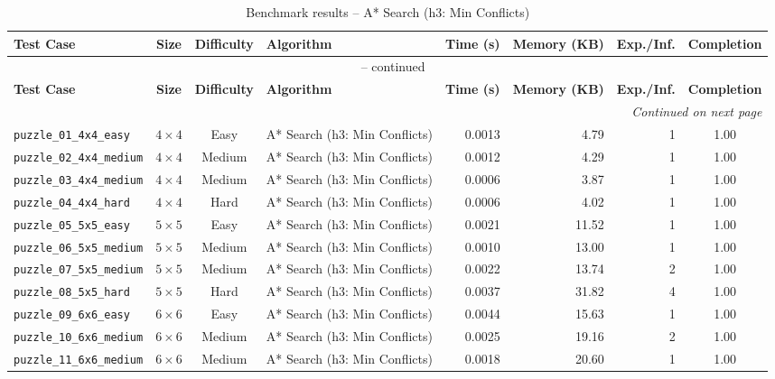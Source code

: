 \documentclass{article}
\begin{document}
\begin{longtable}{@{}lccl r r r c@{}}
  \caption{Benchmark results -- A* Search (h3: Min Conflicts)} \label{tab:a__search__h3__min_conflicts} \\
  \toprule
  \textbf{Test Case} & \textbf{Size} & \textbf{Difficulty} & \textbf{Algorithm} & \textbf{Time (s)} & \textbf{Memory (KB)} & \textbf{Exp./Inf.} & \textbf{Completion} \\
  \midrule
  \endfirsthead
  \multicolumn{8}{c}{\tablename\ \thetable{} -- continued} \\
  \toprule
  \textbf{Test Case} & \textbf{Size} & \textbf{Difficulty} & \textbf{Algorithm} & \textbf{Time (s)} & \textbf{Memory (KB)} & \textbf{Exp./Inf.} & \textbf{Completion} \\
  \midrule
  \endhead
  \midrule
  \multicolumn{8}{r}{\textit{Continued on next page}} \\
  \endfoot
  \bottomrule
  \endlastfoot
  \texttt{puzzle\_01\_4x4\_easy} & $4\times4$ & Easy & A* Search (h3: Min Conflicts) & 0.0013 & 4.79 & 1 & 1.00 \\
  \texttt{puzzle\_02\_4x4\_medium} & $4\times4$ & Medium & A* Search (h3: Min Conflicts) & 0.0012 & 4.29 & 1 & 1.00 \\
  \texttt{puzzle\_03\_4x4\_medium} & $4\times4$ & Medium & A* Search (h3: Min Conflicts) & 0.0006 & 3.87 & 1 & 1.00 \\
  \texttt{puzzle\_04\_4x4\_hard} & $4\times4$ & Hard & A* Search (h3: Min Conflicts) & 0.0006 & 4.02 & 1 & 1.00 \\
  \texttt{puzzle\_05\_5x5\_easy} & $5\times5$ & Easy & A* Search (h3: Min Conflicts) & 0.0021 & 11.52 & 1 & 1.00 \\
  \texttt{puzzle\_06\_5x5\_medium} & $5\times5$ & Medium & A* Search (h3: Min Conflicts) & 0.0010 & 13.00 & 1 & 1.00 \\
  \texttt{puzzle\_07\_5x5\_medium} & $5\times5$ & Medium & A* Search (h3: Min Conflicts) & 0.0022 & 13.74 & 2 & 1.00 \\
  \texttt{puzzle\_08\_5x5\_hard} & $5\times5$ & Hard & A* Search (h3: Min Conflicts) & 0.0037 & 31.82 & 4 & 1.00 \\
  \texttt{puzzle\_09\_6x6\_easy} & $6\times6$ & Easy & A* Search (h3: Min Conflicts) & 0.0044 & 15.63 & 1 & 1.00 \\
  \texttt{puzzle\_10\_6x6\_medium} & $6\times6$ & Medium & A* Search (h3: Min Conflicts) & 0.0025 & 19.16 & 2 & 1.00 \\
  \texttt{puzzle\_11\_6x6\_medium} & $6\times6$ & Medium & A* Search (h3: Min Conflicts) & 0.0018 & 20.60 & 1 & 1.00 \\

\end{longtable}
\end{document}
